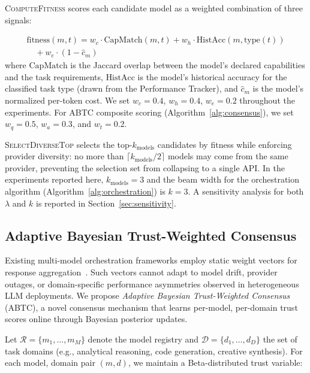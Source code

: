 \documentclass{iopjournal}
\begin{document}
\noindent\textsc{ComputeFitness} scores each candidate model as a weighted combination of three signals:


\begin{equation}
\begin{split}
\text{fitness}(m, t) = w_c \cdot \text{CapMatch}(m, t) + w_h \cdot \text{HistAcc}(m, \text{type}(t)) \\
 \quad + w_e \cdot (1 - \hat{c}_m)
\end{split}
\label{eq:fitness}
\end{equation}
\noindent where $\text{CapMatch}$ is the Jaccard overlap between the model's declared capabilities and the task requirements, $\text{HistAcc}$ is the model's historical accuracy for the classified task type (drawn from the Performance Tracker), and $\hat{c}_m$ is the model's normalized per-token cost. We set $w_c = 0.4$, $w_h = 0.4$, $w_e = 0.2$ throughout the experiments. For ABTC composite scoring (Algorithm~\ref{alg:consensus}), we set $w_q = 0.5$, $w_a = 0.3$, and $w_t = 0.2$.

\noindent\textsc{SelectDiverseTop} selects the top-$k_{\text{models}}$ candidates by fitness while enforcing provider diversity: no more than $\lceil k_{\text{models}}/2 \rceil$ models may come from the same provider, preventing the selection set from collapsing to a single API. In the experiments reported here, $k_{\text{models}} = 3$ and the beam width for the orchestration algorithm (Algorithm~\ref{alg:orchestration}) is $k = 3$. A sensitivity analysis for both $\lambda$ and $k$ is reported in Section~\ref{sec:sensitivity}.

\subsection{Adaptive Bayesian Trust-Weighted Consensus}
\label{sec:abtc}

Existing multi-model orchestration frameworks employ static weight vectors for response aggregation~\cite{AutoGen, MACollab}. Such vectors cannot adapt to model drift, provider outages, or domain-specific performance asymmetries observed in heterogeneous LLM deployments. We propose \emph{Adaptive Bayesian Trust-Weighted Consensus} (ABTC), a novel consensus mechanism that learns per-model, per-domain trust scores online through Bayesian posterior updates.

Let $\mathcal{R} = \{m_1, \ldots, m_M\}$ denote the model registry and $\mathcal{D} = \{d_1, \ldots, d_D\}$ the set of task domains (e.g., analytical reasoning, code generation, creative synthesis). For each model, domain pair $(m, d)$, we maintain a Beta-distributed trust variable:
\end{document}
